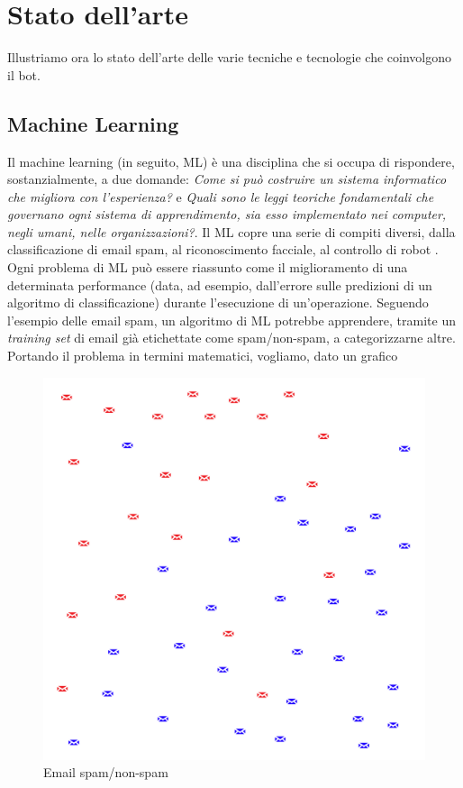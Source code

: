 \chapter{Stato dell'arte}
\label{chap:stateofart}
Illustriamo ora lo stato dell'arte delle varie tecniche e tecnologie che coinvolgono il bot.
\section{Machine Learning}
Il machine learning (in seguito, ML) è una disciplina che si occupa di rispondere, sostanzialmente, a due domande: \textit{Come si può costruire un sistema informatico che migliora con l'esperienza?} e \textit{Quali sono le leggi teoriche fondamentali che governano ogni sistema di apprendimento, sia esso implementato nei computer, negli umani, nelle organizzazioni?}. Il ML copre una serie di compiti diversi, dalla classificazione di email spam, al riconoscimento facciale, al controllo di robot \cite{book:mitchell1997machine}. Ogni problema di ML può essere riassunto come il miglioramento di una determinata performance (data, ad esempio, dall'errore sulle predizioni di un algoritmo di classificazione) durante l'esecuzione di un'operazione. Seguendo l'esempio delle email spam, un algoritmo di ML potrebbe apprendere, tramite un \textit{training set} di email già etichettate come spam/non-spam, a categorizzarne altre.
Portando il problema in termini matematici, vogliamo, dato un grafico
\begin{figure}[H]
    \begin{center}
        \includegraphics[width=0.8\columnwidth]{images/stateofart/noncategorized-spam.png}
    \end{center}
    \caption{Email spam/non-spam}
    \label{fig:noncategorized-spam}
\end{figure}

